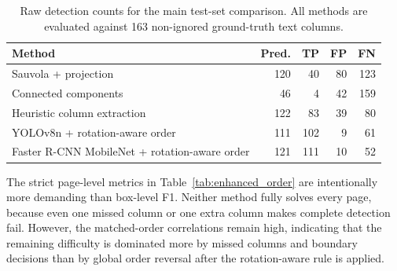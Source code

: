 \documentclass[12pt]{article}
\begin{document}
\begin{table}[t]
\centering
\caption{Raw detection counts for the main test-set comparison. All methods are evaluated against 163 non-ignored ground-truth text columns.}
\label{tab:main_counts}
\begin{tabular}{lrrrr}
\toprule
Method & Pred. & TP & FP & FN \\
\midrule
Sauvola + projection & 120 & 40 & 80 & 123 \\
Connected components & 46 & 4 & 42 & 159 \\
Heuristic column extraction & 122 & 83 & 39 & 80 \\
YOLOv8n + rotation-aware order & 111 & 102 & 9 & 61 \\
Faster R-CNN MobileNet + rotation-aware order & 121 & 111 & 10 & 52 \\
\bottomrule
\end{tabular}
\end{table}

\begin{table}[t]
\centering
\caption{Supplementary page-level and reading-order metrics on the test split. Complete detection requires zero false positives and zero false negatives on a page; full-page success additionally requires perfect reading order among matched columns.}
\label{tab:enhanced_order}
\end{table}

The strict page-level metrics in Table~\ref{tab:enhanced_order} are intentionally more demanding than box-level F1. Neither method fully solves every page, because even one missed column or one extra column makes complete detection fail. However, the matched-order correlations remain high, indicating that the remaining difficulty is dominated more by missed columns and boundary decisions than by global order reversal after the rotation-aware rule is applied.
\end{document}

